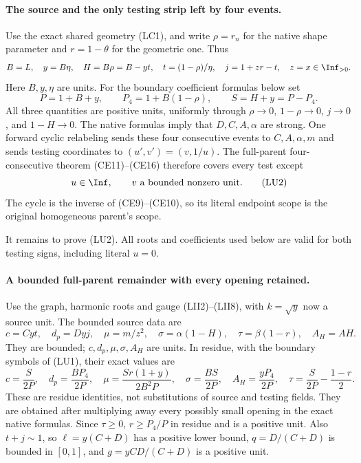 \paragraph{The source and the only testing strip left by four events.}
Use the exact shared geometry (LC1), and write $\rho=r_n$ for the
native shape parameter and $r=1-\theta$ for the geometric one.
Thus
\[
 B=L,\quad y=B\eta,\quad H=B\rho=B-yt,\quad
 t=(1-\rho)/\eta,\quad j=1+zr-t,
 \quad z=x\in\Inf_{>0}.
\]
Here $B,y,\eta$ are units.  For the boundary coefficient formulas
below set
\[
 P=1+B+y,\qquad P_4=1+B(1-\rho),\qquad S=H+y=P-P_4.
                                                               \tag{LU1}
\]
All three quantities are positive units, uniformly through
$\rho\to0$, $1-\rho\to0$, $j\to0$, and $1-H\to0$.
The native formulas imply that $D,C,A,\alpha$ are strong.
One forward cyclic relabeling sends these four consecutive events
to $C,A,\alpha,m$ and sends testing coordinates to
$(u',v')=(v,1/u)$.  The full-parent four-consecutive theorem
(CE11)--(CE16) therefore covers every test except
\[
                    u\in\Inf,\qquad v\text{ a bounded nonzero unit}.
                                                               \tag{LU2}
\]
The cycle is the inverse of (CE9)--(CE10), so its literal endpoint
scope is the original homogeneous parent's scope.

It remains to prove (LU2).  All roots and coefficients used below
are valid for both testing signs, including literal $u=0$.

\paragraph{A bounded full-parent remainder with every opening retained.}
Use the graph, harmonic roots and gauge (LII2)--(LII8), with
$k=\sqrt y$ now a source unit.  The bounded source data are
\[
 c=Cyt,\quad d_p=Dyj,\quad
 \mu=m/z^2,\quad \sigma=\alpha(1-H),\quad
 \tau=\beta(1-r),\quad A_H=AH.
\]
They are bounded; $c,d_p,\mu,\sigma,A_H$ are units.  In residue,
with the boundary symbols of (LU1), their exact values are
\[
 c=\frac S{2P},\quad d_p=\frac{BP_4}{2P},\quad
 \mu=\frac{Sr(1+y)}{2B^2P},\quad
 \sigma=\frac{BS}{2P},\quad A_H=\frac{yP_4}{2P},\quad
 \tau=\frac S{2P}-\frac{1-r}{2}.                         \tag{LU3}
\]
These are residue identities, not substitutions of source and
testing fields.  They are obtained after multiplying away every
possibly small opening in the exact native formulas.
Since $\tau\ge0$, $r\ge P_4/P$ in residue and is a positive unit.
Also $t+j\sim1$, so $\ell=y(C+D)$ has a positive lower bound,
$q=D/(C+D)$ is bounded in $[0,1]$, and
$g=yCD/(C+D)$ is a positive unit.


